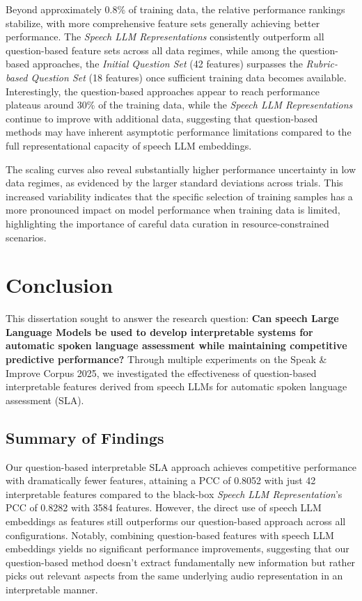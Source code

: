\documentclass{report}
\begin{document}
Beyond approximately 0.8\% of training data, the relative performance rankings stabilize, with more comprehensive feature sets generally achieving better performance. The \emph{Speech LLM Representations} consistently outperform all question-based feature sets across all data regimes, while among the question-based approaches, the \emph{Initial Question Set} (42 features) surpasses the \emph{Rubric-based Question Set} (18 features) once sufficient training data becomes available. Interestingly, the question-based approaches appear to reach performance plateaus around 30\% of the training data, while the \emph{Speech LLM Representations} continue to improve with additional data, suggesting that question-based methods may have inherent asymptotic performance limitations compared to the full representational capacity of speech LLM embeddings.

The scaling curves also reveal substantially higher performance uncertainty in low data regimes, as evidenced by the larger standard deviations across trials. This increased variability indicates that the specific selection of training samples has a more pronounced impact on model performance when training data is limited, highlighting the importance of careful data curation in resource-constrained scenarios.

\chapter{Conclusion}
\label{chap:conclusion}
This dissertation sought to answer the research question: \textbf{Can speech Large Language Models be used to develop interpretable systems for automatic spoken language assessment while maintaining competitive predictive performance?} Through multiple experiments on the Speak \& Improve Corpus 2025, we investigated the effectiveness of question-based interpretable features derived from speech LLMs for automatic spoken language assessment (SLA).

\section{Summary of Findings}
Our question-based interpretable SLA approach achieves competitive performance with dramatically fewer features, attaining a PCC of 0.8052 with just 42 interpretable features compared to the black-box \emph{Speech LLM Representation}'s PCC of 0.8282 with 3584 features. However, the direct use of speech LLM embeddings as features still outperforms our question-based approach across all configurations. Notably, combining question-based features with speech LLM embeddings yields no significant performance improvements, suggesting that our question-based method doesn't extract fundamentally new information but rather picks out relevant aspects from the same underlying audio representation in an interpretable manner.
\end{document}
